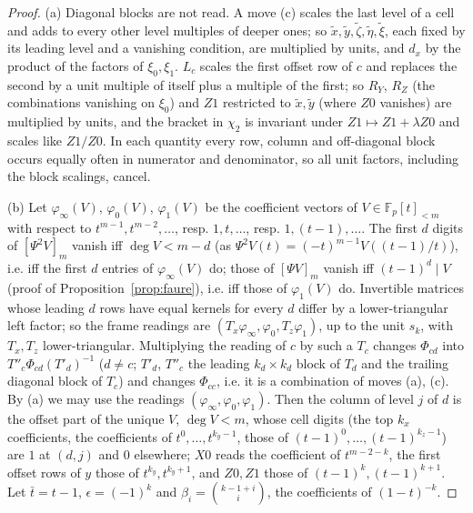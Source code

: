 \documentclass[11pt]{amsart}
\theoremstyle{definition}
\theoremstyle{plain}
\newcommand{\F}{\mathbb{F}}
\begin{document}
\begin{proof}
(a) Diagonal blocks are not read. A move (c) scales the last level of a cell and adds to every other level multiples of deeper ones; so $\tilde x,\tilde y,\tilde\zeta,\tilde\eta,\tilde\xi$, each fixed by its leading level and a vanishing condition, are multiplied by units, and $d_x$ by the product of the factors of $\xi_0,\xi_1$. $L_c$ scales the first offset row of $c$ and replaces the second by a unit multiple of itself plus a multiple of the first; so $R_Y$, $R_Z$ (the combinations vanishing on $\xi_0$) and $Z1$ restricted to $\tilde x,\tilde y$ (where $Z0$ vanishes) are multiplied by units, and the bracket in $\chi_2$ is invariant under $Z1\mapsto Z1+\lambda Z0$ and scales like $Z1/Z0$. In each quantity every row, column and off-diagonal block occurs equally often in numerator and denominator, so all unit factors, including the block scalings, cancel.

(b) Let $\varphi_\infty(V)$, $\varphi_0(V)$, $\varphi_1(V)$ be the coefficient vectors of $V\in\F_p[t]_{<m}$ with respect to $t^{m-1},t^{m-2},\dots$, resp. $1,t,\dots$, resp. $1,(t-1),\dots$. The first $d$ digits of $[\Psi^2V]_m$ vanish iff $\deg V<m-d$ (as $\Psi^2V(t)=(-t)^{m-1}V((t-1)/t)$), i.e. iff the first $d$ entries of $\varphi_\infty(V)$ do; those of $[\Psi V]_m$ vanish iff $(t-1)^d\mid V$ (proof of Proposition~\ref{prop:faure}), i.e. iff those of $\varphi_1(V)$ do. Invertible matrices whose leading $d$ rows have equal kernels for every $d$ differ by a lower-triangular left factor; so the frame readings are $(T_x\varphi_\infty,\varphi_0,T_z\varphi_1)$, up to the unit $s_k$, with $T_x,T_z$ lower-triangular. Multiplying the reading of $c$ by such a $T_c$ changes $\Phi_{cd}$ into $T''_c\Phi_{cd}(T'_d)^{-1}$ ($d\ne c$; $T'_d$, $T''_c$ the leading $k_d\times k_d$ block of $T_d$ and the trailing diagonal block of $T_c$) and changes $\Phi_{cc}$, i.e. it is a combination of moves (a), (c). By (a) we may use the readings $(\varphi_\infty,\varphi_0,\varphi_1)$. Then the column of level $j$ of $d$ is the offset part of the unique $V$, $\deg V<m$, whose cell digits (the top $k_x$ coefficients, the coefficients of $t^0,\dots,t^{k_y-1}$, those of $(t-1)^0,\dots,(t-1)^{k_z-1}$) are $1$ at $(d,j)$ and $0$ elsewhere; $X0$ reads the coefficient of $t^{m-2-k}$, the first offset rows of $y$ those of $t^{k_y},t^{k_y+1}$, and $Z0,Z1$ those of $(t-1)^k,(t-1)^{k+1}$. Let $\bar t=t-1$, $\epsilon=(-1)^k$ and $\beta_i=\binom{k-1+i}{i}$, the coefficients of $(1-t)^{-k}$.


\end{proof}
\end{document}
